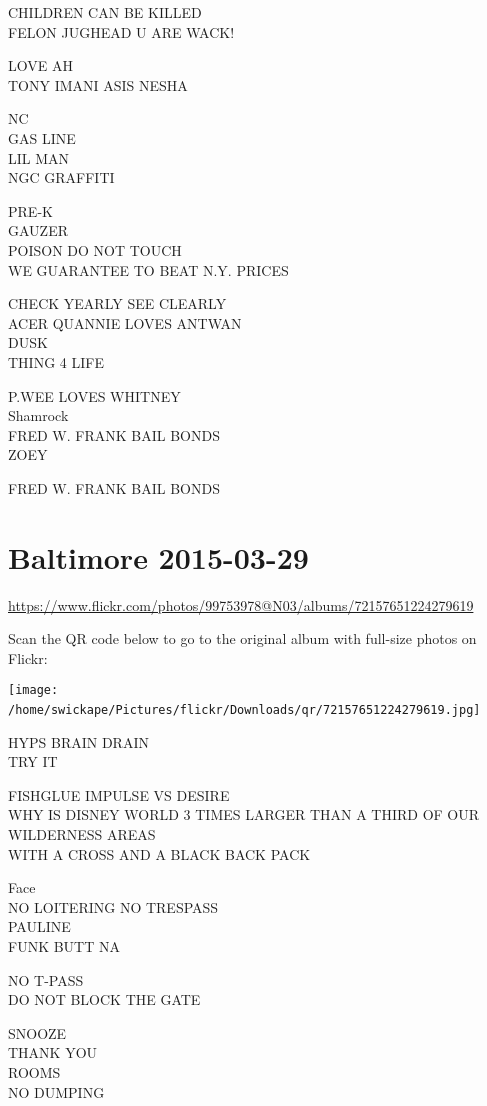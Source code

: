 \documentclass[10pt,letterpaper]{article}
\begin{document}
CHILDREN CAN BE KILLED\\
FELON JUGHEAD U ARE WACK!

LOVE AH\\
TONY IMANI ASIS NESHA

NC\\
GAS LINE\\
LIL MAN\\
NGC GRAFFITI

PRE{-}K\\
GAUZER\\
POISON DO NOT TOUCH\\
WE GUARANTEE TO BEAT N.Y. PRICES

CHECK YEARLY SEE CLEARLY\\
ACER QUANNIE LOVES ANTWAN\\
DUSK\\
THING 4 LIFE

P.WEE LOVES WHITNEY\\
Shamrock\\
FRED W. FRANK BAIL BONDS\\
ZOEY

FRED W. FRANK BAIL BONDS
\

\section*{Baltimore 2015-03-29}

\url{https://www.flickr.com/photos/99753978@N03/albums/72157651224279619}

Scan the QR code below to go to the original album with full-size photos on Flickr:

\texttt{[image: /home/swickape/Pictures/flickr/Downloads/qr/72157651224279619.jpg]}
\

HYPS BRAIN DRAIN\\
TRY IT

FISHGLUE IMPULSE VS DESIRE\\
WHY IS DISNEY WORLD 3 TIMES LARGER THAN A THIRD OF OUR WILDERNESS AREAS\\
WITH A CROSS AND A BLACK BACK PACK

Face\\
NO LOITERING NO TRESPASS\\
PAULINE\\
FUNK BUTT NA

NO T{-}PASS\\
DO NOT BLOCK THE GATE

SNOOZE\\
THANK YOU\\
ROOMS\\
NO DUMPING
\end{document}
